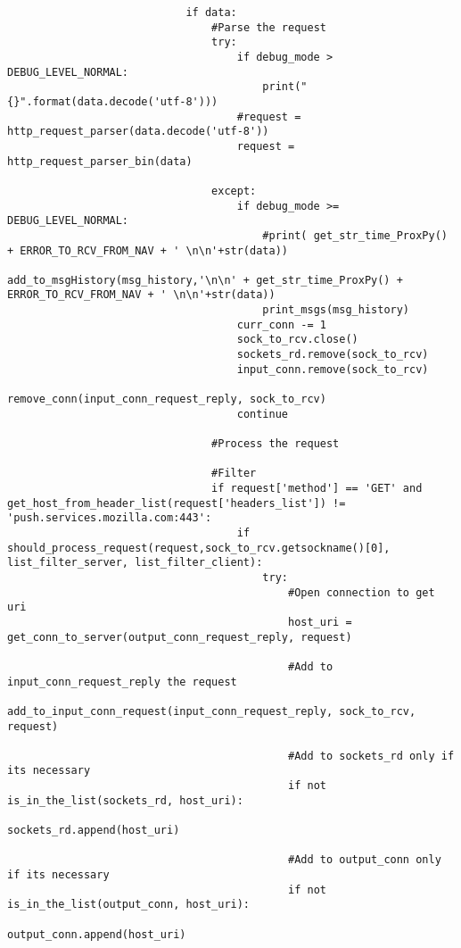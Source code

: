 \begin{verbatim}
                            if data:
                                #Parse the request
                                try:
                                    if debug_mode > DEBUG_LEVEL_NORMAL:
                                        print("{}".format(data.decode('utf-8')))
                                    #request = http_request_parser(data.decode('utf-8'))
                                    request = http_request_parser_bin(data)

                                except:
                                    if debug_mode >= DEBUG_LEVEL_NORMAL:
                                        #print( get_str_time_ProxPy() + ERROR_TO_RCV_FROM_NAV + ' \n\n'+str(data))
                                        add_to_msgHistory(msg_history,'\n\n' + get_str_time_ProxPy() + ERROR_TO_RCV_FROM_NAV + ' \n\n'+str(data))
                                        print_msgs(msg_history)
                                    curr_conn -= 1
                                    sock_to_rcv.close()
                                    sockets_rd.remove(sock_to_rcv)
                                    input_conn.remove(sock_to_rcv)
                                    remove_conn(input_conn_request_reply, sock_to_rcv)
                                    continue

                                #Process the request

                                #Filter
                                if request['method'] == 'GET' and get_host_from_header_list(request['headers_list']) != 'push.services.mozilla.com:443':
                                    if should_process_request(request,sock_to_rcv.getsockname()[0], list_filter_server, list_filter_client):
                                        try:   
                                            #Open connection to get uri
                                            host_uri = get_conn_to_server(output_conn_request_reply, request)

                                            #Add to input_conn_request_reply the request
                                            add_to_input_conn_request(input_conn_request_reply, sock_to_rcv, request)

                                            #Add to sockets_rd only if its necessary
                                            if not is_in_the_list(sockets_rd, host_uri):
                                                sockets_rd.append(host_uri)

                                            #Add to output_conn only if its necessary
                                            if not is_in_the_list(output_conn, host_uri):
                                                output_conn.append(host_uri)


\end{verbatim}
